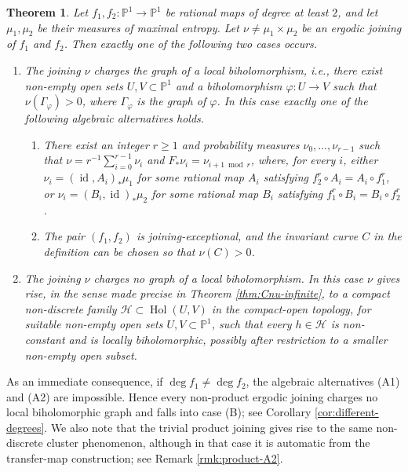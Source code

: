\documentclass[11pt]{amsart}
\numberwithin{equation}{section}
\theoremstyle{plain}
\newtheorem{thm}{Theorem}[section]
\theoremstyle{definition}
\theoremstyle{remark}
\begin{document}
\begin{thm}\label{thm_main}
Let $f_1,f_2\colon \mathbb P^1\to\mathbb P^1$ be rational maps of
degree at least $2$, and let $\mu_1,\mu_2$ be their measures of
maximal entropy. Let $\nu\neq\mu_1\times\mu_2$ be an ergodic joining
of $f_1$ and $f_2$. Then exactly one of the following two cases
occurs.

\begin{enumerate}
\item[(A)]
The joining $\nu$ charges the graph 
of a local biholomorphism, i.e., there
exist non-empty open sets $U,V\subset\mathbb P^1$ and a biholomorphism
$\varphi\colon U\to V$ such that $\nu(\Gamma_\varphi)>0$,
where $\Gamma_\varphi$ is the graph of $\varphi$.
In this case exactly
one of the following algebraic alternatives holds.

\begin{enumerate}
\item[(A1)]
There exist an integer $r\geq1$ and probability measures
$\nu_0,\ldots,\nu_{r-1}$ such that
$\nu=r^{-1}\sum_{i=0}^{r-1}\nu_i$ and
$F_*\nu_i=\nu_{i+1\bmod r}$, where, for every $i$, either
$\nu_i=(\operatorname{id},A_i)_*\mu_1$ for some rational map $A_i$
satisfying $f_2^r\circ A_i=A_i\circ f_1^r$, or
$\nu_i=(B_i,\operatorname{id})_*\mu_2$ for some rational map $B_i$
satisfying $f_1^r\circ B_i=B_i\circ f_2^r$.

\item[(A2)]
The pair $(f_1,f_2)$ is joining-exceptional, and the invariant curve
$C$ in the definition can be chosen so that $\nu(C)>0$.
\end{enumerate}

\item[(B)]
The joining $\nu$ charges no graph of a local biholomorphism.
In this case $\nu$ gives rise, in the sense made precise in Theorem
\ref{thm:Cnu-infinite}, to a compact non-discrete family
$\mathcal H\subset\operatorname{Hol}(U,V)$ in the compact-open
topology, for suitable non-empty open sets $U,V\subset\mathbb P^1$,
such that every $h\in\mathcal H$ is non-constant and is locally
biholomorphic, possibly
after restriction to a smaller non-empty open subset.
\end{enumerate}
\end{thm}

As an immediate consequence, if $\deg f_1\neq\deg f_2$, the
algebraic alternatives \textup{(A1)} and \textup{(A2)} are
impossible. Hence every non-product ergodic joining charges no local
biholomorphic graph and falls into case \textup{(B)}; see Corollary
\ref{cor:different-degrees}. We also note that the trivial product joining
gives rise to the same non-discrete cluster phenomenon, although in
that case it is automatic from the transfer-map construction; see
Remark \ref{rmk:product-A2}.
\end{document}
